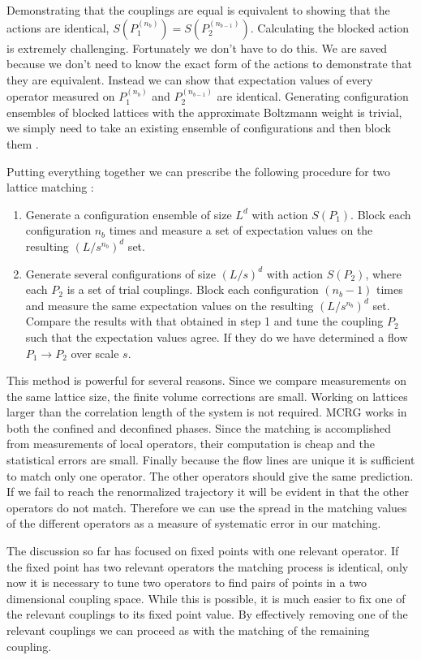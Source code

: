 Demonstrating that the couplings are equal is equivalent to showing that the actions are identical, $S(P_1^{(n_b)})=S(P_2^{(n_{b-1})})$.
Calculating the blocked action is extremely challenging. 
Fortunately we don't have to do this.
We are saved because we don't need to know the exact form of the actions to demonstrate that they are equivalent.
Instead we can show that expectation values of every operator measured on $P_1^{(n_b)}$ and $P_2^{(n_{b-1})}$ are identical.
Generating configuration ensembles of blocked lattices with the approximate Boltzmann weight is trivial, we simply need to take an existing ensemble of configurations and then block them \cite{Swendsen:1979}.

Putting everything together we can prescribe the following procedure for two lattice matching \cite{Hasenfratz:2009}:
\begin{enumerate}
  \item Generate a configuration ensemble of size $L^d$ with action $S(P_1)$. Block each configuration $n_b$ times and measure a set of expectation values on the resulting $(L/s^{n_b})^d$ set.
  \item Generate several configurations of size $(L/s)^d$ with action $S(P_2)$, where each $P_2$ is a set of trial couplings. Block each configuration $(n_b-1)$ times and measure the same expectation values on the resulting $(L/s^{n_b})^d$ set. Compare the results with that obtained in step 1 and tune the coupling $P_2$ such that the expectation values agree. If they do we have determined a flow $P_1\rightarrow P_2$ over scale $s$.
\end{enumerate}

This method is powerful for several reasons.
Since we compare measurements on the same lattice size, the finite volume corrections are small.
Working on lattices larger than the correlation length of the system is not required.
MCRG works in both the confined and deconfined phases.
Since the matching is accomplished from measurements of local operators, their computation is cheap and the statistical errors are small.
Finally because the flow lines are unique it is sufficient to match only one operator.
The other operators should give the same prediction.
If we fail to reach the renormalized trajectory it will be evident in that the other operators do not match.
Therefore we can use the spread in the matching values of the different operators as a measure of systematic error in our matching.

The discussion so far has focused on fixed points with one relevant operator.
If the fixed point has two relevant operators the matching process is identical, only now it is necessary to tune two operators to find pairs of points in a two dimensional coupling space.
While this is possible, it is much easier to fix one of the relevant couplings to its fixed point value.
By effectively removing one of the relevant couplings we can proceed as with the matching of the remaining coupling.

